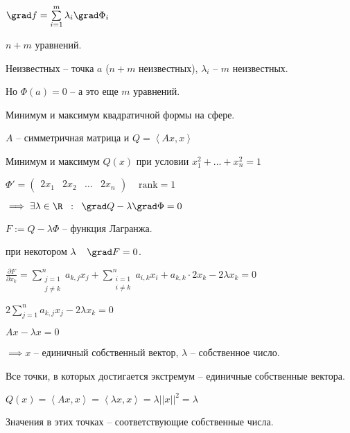 \begin{remark}\thmslashn
	
	$\grad f = \sum\limits_{i = 1}^{m} \lambda_i \grad \Phi_i$
	
	$n+m$ уравнений.
	
	Неизвестных -- точка $a$ ($n + m$ неизвестных), $\lambda_i$ -- $m$ неизвестных.
	
	Но $\Phi(a) = 0$ -- а это еще $m$ уравнений.
\end{remark}

\begin{example}\thmslashn
	
	
	Минимум и максимум квадратичной формы на сфере.
	
	$A$ -- симметричная матрица и $Q = \left< Ax, x \right>$
	
	Минимум и максимум $Q(x)$ при условии $x_1^2+...+x_n^2 = 1$ 
	
	$\Phi' = \begin{pmatrix}
	2x_1 & 2x_2 & \dots & 2x_n
	\end{pmatrix} \;\;\;\; \text{rank} = 1$
	
	$\implies \exists \lambda \in \R \;\; : \;\; \grad Q - \lambda \grad \Phi = 0$
	
	$F := Q - \lambda \Phi$ -- функция Лагранжа.
	
	при некотором $\lambda \;\;\;\; \grad F = 0$.
	
	$\frac{\partial F}{\partial x_k} = \sum\limits_{\substack{j = 1\\j\ne k}}^{n} a_{k,j} x_j + \sum\limits_{\substack{i=1\\i\ne k}}^{n} a_{i,k} x_i + a_{k,k}\cdot 2x_k - 2\lambda x_k = 0$
	
	$2\sum\limits_{j = 1}^{n}a_{k,j} x_j - 2 \lambda x_k = 0$
	
	$Ax - \lambda x = 0$
	
	$\implies x$ -- единичный собственный вектор, $\lambda$ -- собственное число.
	
	Все точки, в которых достигается экстремум -- единичные собственные вектора.
	
	$Q(x) = \left< Ax, x\right> = \left< \lambda x, x\right> = \lambda ||x||^2 = \lambda$
	
	Значения в этих точках -- соответствующие собственные числа.
\end{example}

